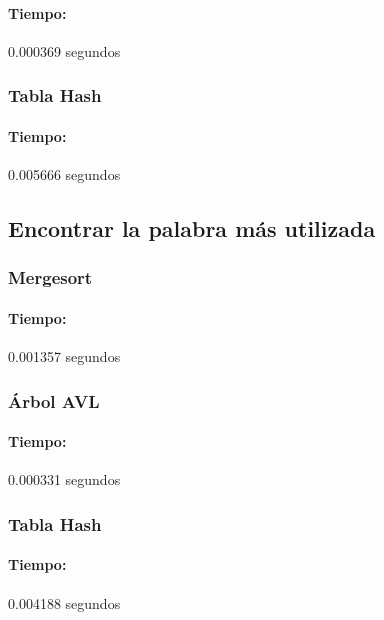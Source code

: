\documentclass[12pt,letterpaper]{scrartcl}
\begin{document}
\paragraph{Tiempo:} 0.000369 segundos



\subsubsection{Tabla Hash}

\paragraph{Tiempo:} 0.005666 segundos



\subsection{Encontrar la palabra más utilizada}

\subsubsection{Mergesort}

\paragraph{Tiempo:} 0.001357 segundos


\subsubsection{Árbol AVL}

\paragraph{Tiempo:} 0.000331 segundos

\subsubsection{Tabla Hash}

\paragraph{Tiempo:} 0.004188 segundos
\end{document}
